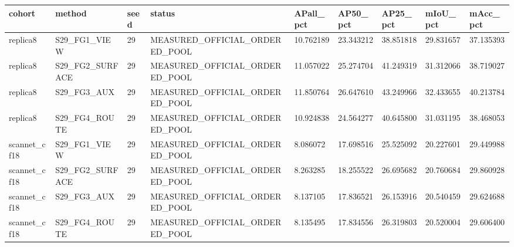 \begin{tabular}{lllllllll}
\toprule
cohort & method & seed & status & APall\_pct & AP50\_pct & AP25\_pct & mIoU\_pct & mAcc\_pct \\
\midrule
replica8 & S29\_FG1\_VIEW & 29 & MEASURED\_OFFICIAL\_ORDERED\_POOL & 10.762189 & 23.343212 & 38.851818 & 29.831657 & 37.135393 \\
replica8 & S29\_FG2\_SURFACE & 29 & MEASURED\_OFFICIAL\_ORDERED\_POOL & 11.057022 & 25.274704 & 41.249319 & 31.312066 & 38.719027 \\
replica8 & S29\_FG3\_AUX & 29 & MEASURED\_OFFICIAL\_ORDERED\_POOL & 11.850764 & 26.647610 & 43.249966 & 32.433655 & 40.213784 \\
replica8 & S29\_FG4\_ROUTE & 29 & MEASURED\_OFFICIAL\_ORDERED\_POOL & 10.924838 & 24.564277 & 40.645800 & 31.031195 & 38.468053 \\
scannet\_cf18 & S29\_FG1\_VIEW & 29 & MEASURED\_OFFICIAL\_ORDERED\_POOL & 8.086072 & 17.698516 & 25.525092 & 20.227601 & 29.449988 \\
scannet\_cf18 & S29\_FG2\_SURFACE & 29 & MEASURED\_OFFICIAL\_ORDERED\_POOL & 8.263285 & 18.255522 & 26.695682 & 20.760684 & 29.860928 \\
scannet\_cf18 & S29\_FG3\_AUX & 29 & MEASURED\_OFFICIAL\_ORDERED\_POOL & 8.137105 & 17.836521 & 26.153916 & 20.540459 & 29.624688 \\
scannet\_cf18 & S29\_FG4\_ROUTE & 29 & MEASURED\_OFFICIAL\_ORDERED\_POOL & 8.135495 & 17.834556 & 26.319803 & 20.520004 & 29.606400 \\
\bottomrule
\end{tabular}
